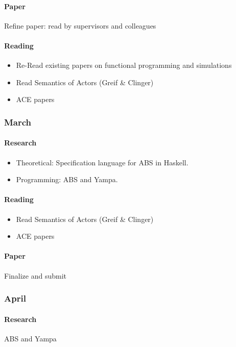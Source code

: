\paragraph{Paper} Refine paper: read by supervisors and colleagues
	
\paragraph{Reading}
	\begin{itemize}
		\item Re-Read existing papers on functional programming and simulations 
		\item Read Semantics of Actors (Greif \& Clinger)
		\item ACE papers
	\end{itemize}
	
\subsubsection{March}
\paragraph{Research}
	\begin{itemize}
		\item Theoretical: Specification language for ABS in Haskell.
		\item Programming: ABS and Yampa.
	\end{itemize}
	
\paragraph{Reading}
	\begin{itemize}
		\item Read Semantics of Actors (Greif \& Clinger)
		\item ACE papers
	\end{itemize}
	
\paragraph{Paper} Finalize and submit

\subsubsection{April}
\paragraph{Research} ABS and Yampa
	
